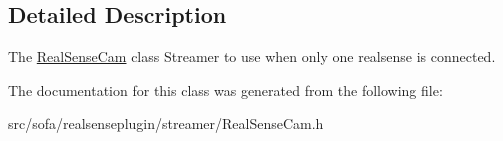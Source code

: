 \subsection{Detailed Description}
The \hyperlink{classsofa_1_1rgbdtracking_1_1_real_sense_cam}{Real\+Sense\+Cam} class Streamer to use when only one realsense is connected. 

The documentation for this class was generated from the following file\+:\begin{DoxyCompactItemize}
\item 
src/sofa/realsenseplugin/streamer/Real\+Sense\+Cam.\+h\end{DoxyCompactItemize}
